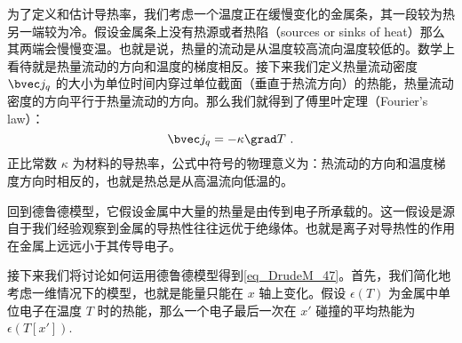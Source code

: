 为了定义和估计导热率，我们考虑一个温度正在缓慢变化的金属条，其一段较为热另一端较为冷。假设金属条上没有热源或者热陷（sources or sinks of heat）那么其两端会慢慢变温。也就是说，热量的流动是从温度较高流向温度较低的。数学上看待就是热量流动的方向和温度的梯度相反。接下来我们定义热量流动密度 $\bvec j_q$ 的大小为单位时间内穿过单位截面（垂直于热流方向）的热能，热量流动密度的方向平行于热量流动的方向。那么我们就得到了傅里叶定理（Fourier's law）：
\begin{equation}
\bvec j_q =-\kappa\grad T~.
\end{equation}
正比常数 $\kappa$ 为材料的导热率，公式中符号的物理意义为：热流动的方向和温度梯度方向时相反的，也就是热总是从高温流向低温的。

回到德鲁德模型，它假设金属中大量的热量是由传到电子所承载的。这一假设是源自于我们经验观察到金属的导热性往往远优于绝缘体。也就是离子对导热性的作用在金属上远远小于其传导电子。

接下来我们将讨论如何运用德鲁德模型得到\autoref{eq_DrudeM_47}。首先，我们简化地考虑一维情况下的模型，也就是能量只能在 $x$ 轴上变化。假设 $\epsilon(T)$ 为金属中单位电子在温度 $T$ 时的热能，那么一个电子最后一次在 $x'$ 碰撞的平均热能为 $\epsilon(T[x'])$.

